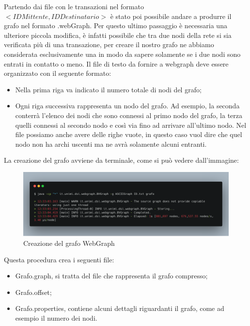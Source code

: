 \documentclass[12pt]{report}
\begin{document}
Partendo dai file con le transazioni nel formato $<IDMittente, IDDestinatario>$ è stato poi possibile andare a produrre il grafo nel formato .webGraph.
Per questo ultimo passaggio è necessaria una ulteriore piccola modifica, è infatti possibile che tra due nodi della rete si sia verificata più di una transazione, per creare il nostro grafo ne abbiamo considerata esclusivamente una in modo da sapere solamente se i due nodi sono entrati in contatto o meno.
\newline Il file di testo da fornire a webgraph deve essere organizzato con il seguente formato:
\begin{itemize}
    \item Nella prima riga va indicato il numero totale di nodi del grafo;
    \item Ogni riga successiva rappresenta un nodo del grafo. Ad esempio, la seconda conterrà l'elenco dei nodi che sono connessi al primo nodo del grafo, la terza quelli connessi al secondo nodo e così via fino ad arrivare all'ultimo nodo.
    Nel file possiamo anche avere delle righe vuote, in questo caso vuol dire che quel nodo non ha archi uscenti ma ne avrà solamente alcuni entranti.
\end{itemize}
La creazione del grafo avviene da terminale, come si può vedere dall'immagine:

\begin{figure}[H]
    \includegraphics[width=\textwidth]{carbon-22.png}
    \caption{Creazione del grafo WebGraph}
\end{figure}

Questa procedura crea i seguenti file:

\begin{itemize}
    \item Grafo.graph, si tratta del file che rappresenta il grafo compresso;
    \item Grafo.offset;
    \item Grafo.properties, contiene alcuni dettagli riguardanti il grafo, come ad esempio il numero dei nodi.
\end{itemize}
\end{document}
